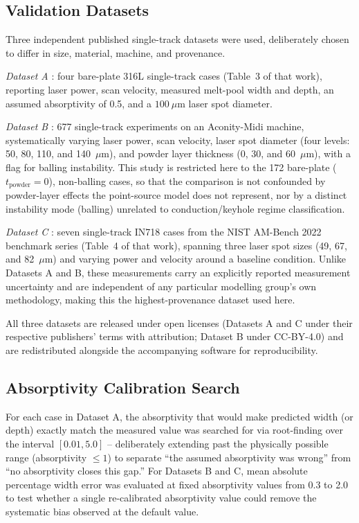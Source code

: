 \documentclass[12pt]{article}
\begin{document}
\subsection{Validation Datasets}
Three independent published single-track datasets were used, deliberately chosen to differ in size, material, machine, and provenance.

\emph{Dataset A} \cite{zhang2024}: four bare-plate 316L single-track cases (Table~3 of that work), reporting laser power, scan velocity, measured melt-pool width and depth, an assumed absorptivity of 0.5, and a $100~\mu\text{m}$ laser spot diameter.

\emph{Dataset B} \cite{hofmann2026}: 677 single-track experiments on an Aconity-Midi machine, systematically varying laser power, scan velocity, laser spot diameter (four levels: 50, 80, 110, and 140~$\mu$m), and powder layer thickness (0, 30, and 60~$\mu$m), with a flag for balling instability. This study is restricted here to the 172 bare-plate ($t_{\text{powder}}=0$), non-balling cases, so that the comparison is not confounded by powder-layer effects the point-source model does not represent, nor by a distinct instability mode (balling) unrelated to conduction/keyhole regime classification.

\emph{Dataset C} \cite{weaver2024}: seven single-track IN718 cases from the NIST AM-Bench 2022 benchmark series (Table~4 of that work), spanning three laser spot sizes (49, 67, and 82~$\mu$m) and varying power and velocity around a baseline condition. Unlike Datasets A and B, these measurements carry an explicitly reported measurement uncertainty and are independent of any particular modelling group's own methodology, making this the highest-provenance dataset used here.

All three datasets are released under open licenses (Datasets A and C under their respective publishers' terms with attribution; Dataset B under CC-BY-4.0) and are redistributed alongside the accompanying software for reproducibility.

\subsection{Absorptivity Calibration Search}
For each case in Dataset A, the absorptivity that would make predicted width (or depth) exactly match the measured value was searched for via root-finding over the interval $[0.01, 5.0]$ -- deliberately extending past the physically possible range (absorptivity $\leq 1$) to separate ``the assumed absorptivity was wrong'' from ``no absorptivity closes this gap.'' For Datasets B and C, mean absolute percentage width error was evaluated at fixed absorptivity values from 0.3 to 2.0 to test whether a single re-calibrated absorptivity value could remove the systematic bias observed at the default value.
\end{document}
